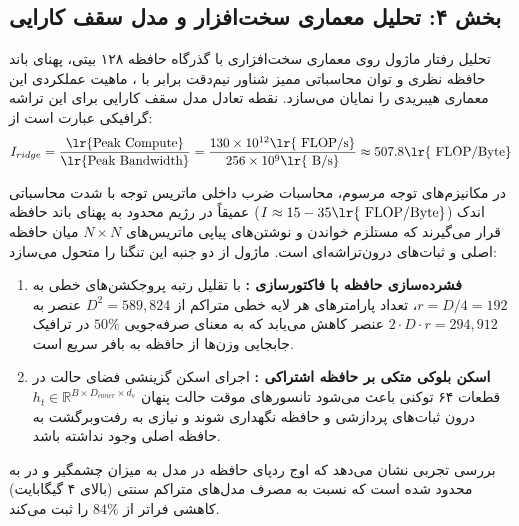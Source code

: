 \subsection*{بخش ۴: تحلیل معماری سخت‌افزار و مدل سقف کارایی }
تحلیل رفتار ماژول  روی معماری سخت‌افزاری  با گذرگاه حافظه ۱۲۸ بیتی، پهنای باند حافظه نظری  و توان محاسباتی ممیز شناور نیم‌دقت  برابر با ، ماهیت عملکردی این معماری هیبریدی را نمایان می‌سازد. نقطه تعادل مدل سقف کارایی  برای این تراشه گرافیکی عبارت است از:
\begin{equation}
I_{ridge} = \frac{\text{\lr{Peak Compute}}}{\text{\lr{Peak Bandwidth}}} = \frac{130 \times 10^{12} \text{\lr{ FLOP/s}}}{256 \times 10^9 \text{\lr{ B/s}}} \approx 507.8 \text{\lr{ FLOP/Byte}}
\end{equation}

در مکانیزم‌های توجه مرسوم، محاسبات ضرب داخلی ماتریس توجه با شدت محاسباتی اندک ($I \approx 15-35\text{\lr{ FLOP/Byte}}$) عمیقاً در رژیم محدود به پهنای باند حافظه  قرار می‌گیرند که مستلزم خواندن و نوشتن‌های پیاپی ماتریس‌های $N \times N$ میان حافظه اصلی  و ثبات‌های درون‌تراشه‌ای است. ماژول  از دو جنبه این تنگنا را متحول می‌سازد:
\begin{enumerate}
    \item \textbf{فشرده‌سازی حافظه با فاکتورسازی :} با تقلیل رتبه پروجکشن‌های خطی به $r = D/4 = 192$، تعداد پارامترهای هر لایه خطی متراکم از $D^2 = 589,824$ عنصر به $2 \cdot D \cdot r = 294,912$ عنصر کاهش می‌یابد که به معنای صرفه‌جویی $50\%$ در ترافیک جابجایی وزن‌ها از حافظه  به بافر سریع  است.
    \item \textbf{اسکن بلوکی متکی بر حافظه اشتراکی :} اجرای اسکن گزینشی فضای حالت در قطعات ۶۴ توکنی  باعث می‌شود تانسورهای موقت حالت پنهان $h_t \in \mathbb{R}^{B \times D_{inner} \times d_s}$ درون ثبات‌های پردازشی و حافظه  نگهداری شوند و نیازی به رفت‌وبرگشت به حافظه اصلی  وجود نداشته باشد.
\end{enumerate}

بررسی تجربی نشان می‌دهد که اوج ردپای حافظه  در مدل  به میزان چشمگیر  و در  به  محدود شده است که نسبت به مصرف مدل‌های متراکم سنتی (بالای ۴ گیگابایت) کاهشی فراتر از $84\%$ را ثبت می‌کند.

